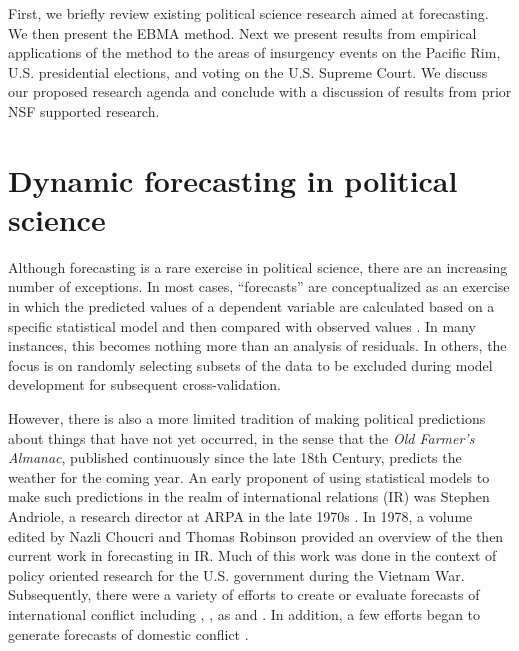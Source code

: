 \documentclass[pdftex,12pt,fullpage,oneside]{amsart}
\begin{document}
First, we briefly review existing political science research aimed at forecasting.  We then present the EBMA method.  Next we
present results from empirical applications of the method to the areas
of insurgency events on the Pacific Rim, U.S. presidential elections,
and voting on the U.S. Supreme Court.  We discuss our proposed
research agenda and conclude with a discussion of
results from prior NSF supported research.

\section{Dynamic forecasting in political science}

Although forecasting is a rare exercise in political science, there
are an increasing number of exceptions.  In most cases, ``forecasts'' are
conceptualized as an exercise in which the predicted values of a
dependent variable are calculated based on a specific statistical
model and then compared with observed values
\citep[e.g.,][]{Hildebrand:etal:1976}. In many instances, this becomes
nothing more than an analysis of residuals.  In others, the focus is
on randomly selecting subsets of the data to be excluded during model
development for subsequent cross-validation.

However, there is also a more limited tradition of making political
predictions about things that have not yet occurred, in the sense that
the \emph{Old Farmer's Almanac}, published continuously since the late
18th Century, predicts the weather for the coming year. An early
proponent of using statistical models to make such predictions in the
realm of international relations (IR) was Stephen Andriole, a research
director at ARPA in the late 1970s \citep{Andriole:Young:1977}. In
1978, a volume edited by Nazli Choucri and Thomas Robinson
\nocite{Chocuri:Robinson:1978} provided an overview of the then
current work in forecasting in IR.  Much of this work was done in the
context of policy oriented research for the U.S. government during the
Vietnam War.  Subsequently, there were a variety of efforts to create
or evaluate forecasts of international conflict including
\citet{Freeman:Job:1979}, \citet{Singer:Wallace:1979}, as and
\citet{Vincent:1980}.  In addition, a few efforts began to generate
forecasts of domestic conflict \citep[e.g.,][]{Gurr:Lichbach:1986}.
\end{document}
